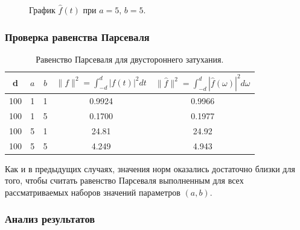 \documentclass[a5paper, 10pt]{article}
\theoremstyle{definition}
\theoremstyle{plain}
\theoremstyle{remark}
\begin{document}
\begin{figure}[h!]
\caption{График $\hat{f}(t)$ при $a = 5$, $b = 5$.}
\end{figure}



\subsubsection{Проверка равенства Парсеваля}

\begin{table}[h!]
\caption{Равенство Парсеваля для двустороннего затухания.}
\label{tabular:timesandtenses}
\begin{center}
\begin{tabular}{|c|c|c|c|c|}
\hline
d & $a$ & $b$ & $\| f \|^2 = \int_{-d}^d |f(t)|^2 dt $ & $\| \hat{f} \|^2 = \int_{-d}^d |\hat{f}(\omega)|^2 d\omega $ \\
\hline
100 & 1 & 1 &  0.9924& 0.9966\\
\hline
100 & 1 & 5 & 0.1700 & 0.1977\\
\hline
100 & 5 & 1 & 24.81 & 24.92 \\
\hline
100 & 5 & 5 & 4.249  & 4.943 \\
\hline
\end{tabular}
\end{center}
\end{table}

Как и в предыдущих случаях, значения норм оказались достаточно близки для того, чтобы считать равенство Парсеваля выполненным для всех рассматриваемых наборов значений параметров $(a, b)$.


\newpage
\subsubsection{Анализ результатов}
\end{document}
